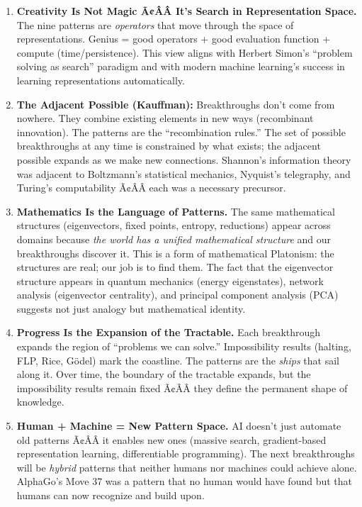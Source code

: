 \begin{enumerate}
\item \textbf{Creativity Is Not Magic Ã¢ÂÂ It's Search in Representation Space.} The nine patterns are \emph{operators} that move through the space of representations. Genius = good operators + good evaluation function + compute (time/persistence). This view aligns with Herbert Simon's ``problem solving as search'' paradigm and with modern machine learning's success in learning representations automatically.

\item \textbf{The Adjacent Possible (Kauffman):} Breakthroughs don't come from nowhere. They combine existing elements in new ways (recombinant innovation). The patterns are the ``recombination rules.'' The set of possible breakthroughs at any time is constrained by what exists; the adjacent possible expands as we make new connections. Shannon's information theory was adjacent to Boltzmann's statistical mechanics, Nyquist's telegraphy, and Turing's computability Ã¢ÂÂ each was a necessary precursor.

\item \textbf{Mathematics Is the Language of Patterns.} The same mathematical structures (eigenvectors, fixed points, entropy, reductions) appear across domains because \emph{the world has a unified mathematical structure} and our breakthroughs discover it. This is a form of mathematical Platonism: the structures are real; our job is to find them. The fact that the eigenvector structure appears in quantum mechanics (energy eigenstates), network analysis (eigenvector centrality), and principal component analysis (PCA) suggests not just analogy but mathematical identity.

\item \textbf{Progress Is the Expansion of the Tractable.} Each breakthrough expands the region of ``problems we can solve.'' Impossibility results (halting, FLP, Rice, G\"odel) mark the coastline. The patterns are the \emph{ships} that sail along it. Over time, the boundary of the tractable expands, but the impossibility results remain fixed Ã¢ÂÂ they define the permanent shape of knowledge.

\item \textbf{Human + Machine = New Pattern Space.} AI doesn't just automate old patterns Ã¢ÂÂ it enables new ones (massive search, gradient-based representation learning, differentiable programming). The next breakthroughs will be \emph{hybrid} patterns that neither humans nor machines could achieve alone. AlphaGo's Move 37 was a pattern that no human would have found but that humans can now recognize and build upon.


\end{enumerate}
